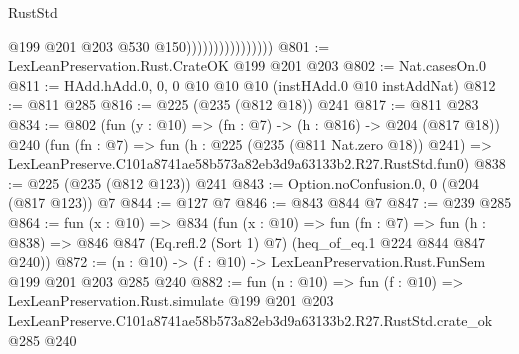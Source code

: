 \begin{lexlean}{RustStd}
\begin{coremodule}
                                    @199
                                    @201
                                    @203
                                    @530
                                    @150))))))))))))))))
@801 := LexLeanPreservation.Rust.CrateOK @199 @201 @203
@802 := Nat.casesOn.{0}
@811 := HAdd.hAdd.{0, 0, 0} @10 @10 @10 (instHAdd.{0} @10 instAddNat)
@812 := @811 @285
@816 := @225 (@235 (@812 @18)) @241
@817 := @811 @283
@834 := @802
    (fun (y : @10) => (fn : @7) -> (h : @816) -> @204 (@817 @18))
    @240
    (fun (fn : @7) =>
    fun (h : @225 (@235 (@811 Nat.zero @18)) @241) =>
    LexLeanPreserve.C101a8741ae58b573a82eb3d9a63133b2.R27.RustStd.fun0)
@838 := @225 (@235 (@812 @123)) @241
@843 := Option.noConfusion.{0, 0} (@204 (@817 @123)) @7
@844 := @127 @7
@846 := @843 @844 @7
@847 := @239 @285
@864 := fun (x : @10) =>
  @834
    (fun (x : @10) =>
    fun (fn : @7) =>
    fun (h : @838) => @846 @847 (Eq.refl.{2} (Sort 1) @7) (heq_of_eq.{1} @224 @844 @847 @240))
@872 := (n : @10) -> (f : @10) -> LexLeanPreservation.Rust.FunSem @199 @201 @203 @285 @240
@882 := fun (n : @10) =>
  fun (f : @10) =>
  LexLeanPreservation.Rust.simulate
    @199
    @201
    @203
    LexLeanPreserve.C101a8741ae58b573a82eb3d9a63133b2.R27.RustStd.crate_ok
    @285
    @240
\end{coremodule}
\end{lexlean}
